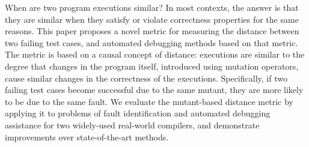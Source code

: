When are two program executions similar?  In most contexts, the answer is that they are similar when they satisfy or violate correctness properties for the same reasons.  This paper proposes a novel metric for measuring the distance between two failing test cases, and automated debugging methods based on that metric.  The metric is based on a causal concept of distance:  executions are similar to the degree that changes in the program itself, introduced using mutation operators, cause similar changes in the correctness of the executions.  Specifically, if two failing test cases become successful due to the same mutant, they are more likely to be due to the same fault.  We evaluate the mutant-based distance metric by applying it to problems of fault identification and automated debugging assistance for two widely-used real-world compilers, and demonstrate improvements over state-of-the-art methods.
